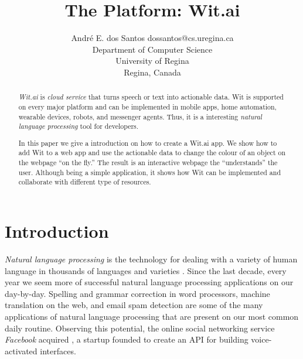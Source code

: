 \documentclass[twoside,11pt]{article}
\begin{document}
\title{The Platform: Wit.ai}

\author{\name André E. dos Santos \email dossantos@cs.uregina.ca \\
\addr Department of Computer Science \\
University of Regina \\ 
Regina, Canada
}



\maketitle

\begin{abstract}%
\emph{Wit.ai} is \emph{cloud service} that turns speech or text into actionable data.
Wit is supported on every major platform and can be implemented in mobile apps, home automation, wearable devices, robots, and messenger agents.
Thus, it is a interesting \emph{natural language processing} tool for developers.

In this paper we give a introduction on how to create a Wit.ai app.
We show how to add Wit to a web app and use the actionable data to change the colour of an object on the webpage ``on the fly.''
The result is an interactive webpage the ``understands'' the user.
Although being a simple application, it shows how Wit can be implemented and collaborate with different type of resources.
\end{abstract}



\section{Introduction}
\label{sec:intro}

\emph{Natural language processing} is the technology for dealing with a variety of human language in thousands of languages and varieties \citep{jurafsky2014speech}. 
Since the last decade, every year we seem more of successful natural language processing applications on our day-by-day.
Spelling and grammar correction in word processors, machine translation on the web, and email spam detection are some of the many applications of natural language processing that are present on our most common daily routine.
Observing this potential, the online social networking service \emph{Facebook} acquired \cite{1_wit.ai_2016}, a startup founded to create an API for building voice-activated interfaces. 
\end{document}
